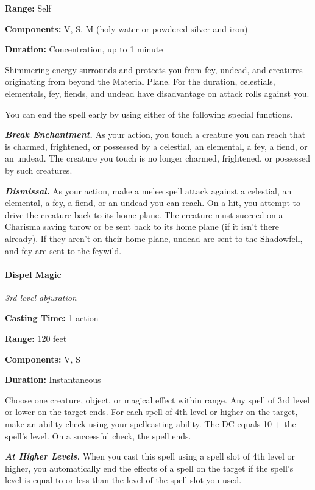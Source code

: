 \documentclass[
]{article}
\begin{document}
\textbf{Range:} Self

\textbf{Components:} V, S, M (holy water or powdered silver and iron)

\textbf{Duration:} Concentration, up to 1 minute

Shimmering energy surrounds and protects you from fey, undead, and
creatures originating from beyond the Material Plane. For the duration,
celestials, elementals, fey, fiends, and undead have disadvantage on
attack rolls against you.

You can end the spell early by using either of the following special
functions.

\emph{\textbf{Break Enchantment.}} As your action, you touch a creature
you can reach that is charmed, frightened, or possessed by a celestial,
an elemental, a fey, a fiend, or an undead. The creature you touch is no
longer charmed, frightened, or possessed by such creatures.

\emph{\textbf{Dismissal.}} As your action, make a melee spell attack
against a celestial, an elemental, a fey, a fiend, or an undead you can
reach. On a hit, you attempt to drive the creature back to its home
plane. The creature must succeed on a Charisma saving throw or be sent
back to its home plane (if it isn't there already). If they aren't on
their home plane, undead are sent to the Shadowfell, and fey are sent to
the feywild.

\hypertarget{dispel-magic}{%
\paragraph{Dispel Magic}\label{dispel-magic}}

\emph{3rd-level abjuration}

\textbf{Casting Time:} 1 action

\textbf{Range:} 120 feet

\textbf{Components:} V, S

\textbf{Duration:} Instantaneous

Choose one creature, object, or magical effect within range. Any spell
of 3rd level or lower on the target ends. For each spell of 4th level or
higher on the target, make an ability check using your spellcasting
ability. The DC equals 10 + the spell's level. On a successful check,
the spell ends.

\emph{\textbf{At Higher Levels.}} When you cast this spell using a spell
slot of 4th level or higher, you automatically end the effects of a
spell on the target if the spell's level is equal to or less than the
level of the spell slot you used.
\end{document}

